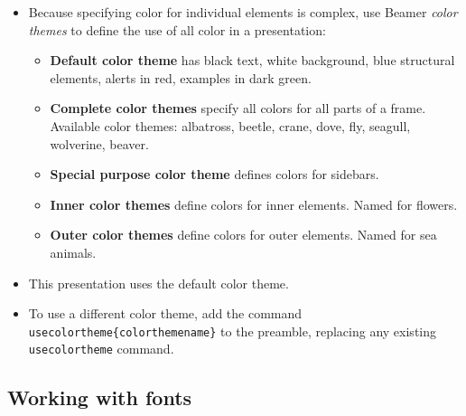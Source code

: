 \documentclass[notes=show,beamer]{beamer}
\begin{document}
\begin{frame}%


\begin{itemize}
\item Because specifying color for individual elements is complex, use
Beamer \textit{color themes} to define the use of all color in a
presentation:

\begin{itemize}
\item \textbf{Default color theme} has black text, white background, blue
structural elements, alerts in red, examples in dark green.

\item \textbf{Complete color themes }specify all colors for all parts of a
frame. Available color themes: albatross, beetle, crane, dove, fly, seagull,
wolverine, beaver.

\item \textbf{Special purpose color theme }defines colors for sidebars.

\item \textbf{Inner color themes }define colors for inner elements. Named
for flowers.

\item \textbf{Outer color themes} define colors for outer elements. Named
for sea animals.
\end{itemize}

\item This presentation uses the default color theme.

\item To use a different color theme, add the command \texttt{\TEXTsymbol{%
\backslash}usecolortheme\{colorthemename\}} to the preamble, replacing any
existing \texttt{\TEXTsymbol{\backslash}usecolortheme} command.
\end{itemize}

\transboxout%
\end{frame}%

\subsection{Working with fonts}
\end{document}
